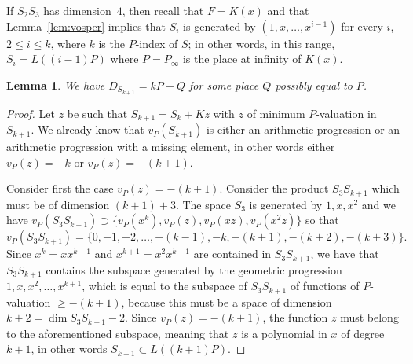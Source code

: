 \documentclass[10pt]{amsart}
\newtheorem{lemm}[theo]{Lemma}
\theoremstyle{definition}
\theoremstyle{remark}
\renewcommand{\geq}{\geqslant}
\renewcommand{\leq}{\leqslant}
\begin{document}
If $S_2 S_3$ has dimension~$4$, then recall that $F=K(x)$ and that Lemma~\ref{lem:vosper} implies that $S_i$ is generated by $(1,x,\dots,x^{i-1})$ for every $i$, $2\leq i\leq k$, where $k$ is the $P$-index of $S$; in other words, in this range, $S_i=L((i-1)P)$ where $P=P_{\infty}$ is the place at infinity of $K(x)$.

\begin{lemm}\label{lem:kP+Q}
We have $D_{S_{k+1}}= kP+Q$ for some place $Q$ possibly equal to $P$.
\end{lemm}

\begin{proof}
Let $z$ be such that $S_{k+1}=S_k+Kz$ with $z$ of minimum $P$-valuation in $S_{k+1}$. We already know that $v_P(S_{k+1})$ is either an arithmetic progression or an arithmetic progression with a missing element, in other words either $v_P(z)=-k$ or $v_P(z)=-(k+1)$.

Consider first the case $v_P(z)=-(k+1)$. Consider the product $S_3S_{k+1}$ which must be of dimension $(k+1)+3$. The space $S_3$ is generated by $1,x,x^2$ and we have $v_P(S_3S_{k+1})\supset\{v_P(x^k), v_P(z), v_P(xz),v_P(x^2z)\}$ so that
\[
v_P(S_3S_{k+1})=\{0,-1,-2,\ldots,-(k-1),-k,-(k+1),-(k+2),-(k+3)\}.
\]
Since $x^k=xx^{k-1}$ and $x^{k+1}=x^2x^{k-1}$ are contained in $S_3S_{k+1}$, we have that $S_3S_{k+1}$ contains the subspace generated by the geometric progression $1,x,x^2,\ldots,x^{k+1}$, which is equal to the subspace of $S_3S_{k+1}$ of functions of $P$-valuation $\geq-(k+1)$, because this must be a space of dimension $k+2=\dim S_3S_{k+1}-2$. Since $v_P(z)=-(k+1)$, the function $z$ must belong to the aforementioned subspace, meaning that $z$ is a polynomial in $x$ of degree $k+1$, in other words $S_{k+1}\subset L((k+1)P)$.


\end{proof}
\end{document}
